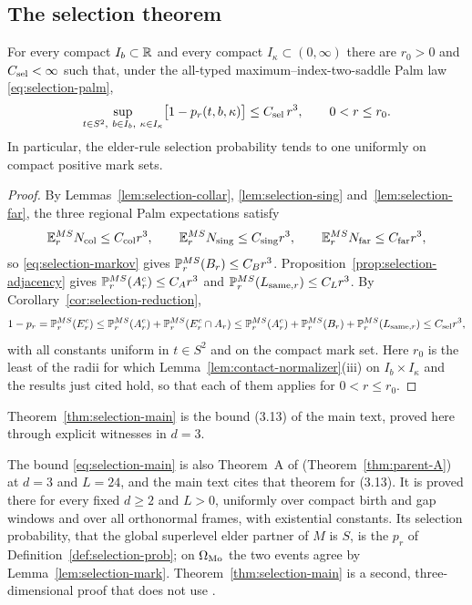 \subsection{The selection theorem}\label{ssec:selection-theorem}

\begin{theorem}\label{thm:selection-main}
For every compact $I_b\subset\mathbb R$ and every compact $I_\kappa\subset(0,\infty)$ there are $r_0>0$ and $C_{\rm sel}<\infty$ such that, under the all-typed maximum--index-two-saddle Palm law \eqref{eq:selection-palm},
\begin{equation}\label{eq:selection-main}
\sup_{t\in S^2,\ b\in I_b,\ \kappa\in I_\kappa}\bigl[1-p_r(t,b,\kappa)\bigr]\le C_{\rm sel}\,r^3,\qquad0<r\le r_0 .
\end{equation}
In particular, the elder-rule selection probability tends to one uniformly on compact positive mark sets.
\end{theorem}

\begin{proof}
By Lemmas~\ref{lem:selection-collar}, \ref{lem:selection-sing} and~\ref{lem:selection-far}, the three regional Palm expectations satisfy
\begin{equation}\label{eq:selection-regional}
\mathbb E^{MS}_rN_{\rm col}\le C_{\rm col}r^3,\qquad\mathbb E^{MS}_rN_{\rm sing}\le C_{\rm sing}r^3,\qquad\mathbb E^{MS}_rN_{\rm far}\le C_{\rm far}r^3,
\end{equation}
so \eqref{eq:selection-markov} gives $\mathbb P^{MS}_r(B_r)\le C_Br^3$. Proposition~\ref{prop:selection-adjacency} gives $\mathbb P^{MS}_r(A_r^c)\le C_Ar^3$ and $\mathbb P^{MS}_r(L_{{\rm same},r})\le C_Lr^3$. By Corollary~\ref{cor:selection-reduction},
\[
1-p_r=\mathbb P^{MS}_r(E_r^c)\le\mathbb P^{MS}_r(A_r^c)+\mathbb P^{MS}_r(E_r^c\cap A_r)\le\mathbb P^{MS}_r(A_r^c)+\mathbb P^{MS}_r(B_r)+\mathbb P^{MS}_r(L_{{\rm same},r})\le C_{\rm sel}r^3,
\]
with all constants uniform in $t\in S^2$ and on the compact mark set. Here $r_0$ is the least of the radii for which Lemma~\ref{lem:contact-normalizer}(iii) on $I_b\times I_\kappa$ and the results just cited hold, so that each of them applies for $0<r\le r_0$.
\end{proof}

Theorem~\ref{thm:selection-main} is the bound (3.13) of the main text, proved here through explicit witnesses in $d=3$.

\begin{remark}\label{rem:selection-parent}
The bound \eqref{eq:selection-main} is also Theorem~A of \cite{parentP} (Theorem~\ref{thm:parent-A}) at $d=3$ and $L=24$, and the main text cites that theorem for (3.13). It is proved there for every fixed $d\ge2$ and $L>0$, uniformly over compact birth and gap windows and over all orthonormal frames, with existential constants. Its selection probability, that the global superlevel elder partner of $M$ is $S$, is the $p_r$ of Definition~\ref{def:selection-prob}; on $\Omega_{\rm Mo}$ the two events agree by Lemma~\ref{lem:selection-mark}. Theorem~\ref{thm:selection-main} is a second, three-dimensional proof that does not use \cite{parentP}.
\end{remark}

